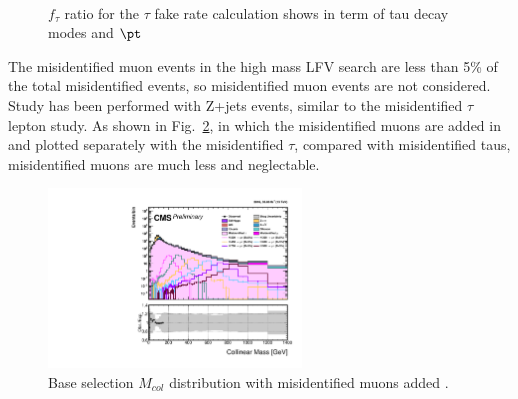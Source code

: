 \begin{figure}[htbp] 
     \centering
      \\
     \caption{$f_{\tau}$ ratio for the $\tau$ fake rate calculation shows in term of tau decay modes and $\pt$}
     \label{fig:fakerationumber}
\end{figure}

The misidentified muon events in the high mass LFV search are less than 5\% of the total misidentified events, so misidentified muon events are not considered. Study has been performed with Z+jets events, similar to the misidentified $\tau$ lepton study. As shown in Fig.~\ref{fig:MisidentifiedMuon}, in which the misidentified muons are added in and plotted separately with the misidentified $\tau$, compared with misidentified taus, misidentified muons are much less and  neglectable. 

\begin{figure}[htbp] 
\centering
\includegraphics[width=0.6\textwidth]{chapterfakerate/LFV_preselection_collMass_type1_200Fakes_PoissonErrorsMuonfake.pdf}
\caption{Base selection $M_{col}$ distribution with misidentified muons added .}
\label{fig:MisidentifiedMuon}
\end{figure}

